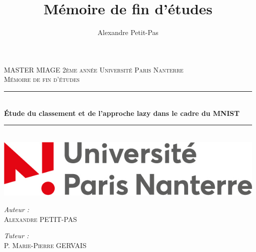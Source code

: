 \documentclass[12pt, twoside, openright]{report}
\author{Alexandre Petit-Pas}
\title{Mémoire de fin d'études}
\begin{document}
%

\setlength{\parindent}{0cm}
\setlength{\parskip}{1ex plus 0.5ex minus 0.2ex}
\newcommand{\hsp}{\hspace{20pt}}
\newcommand{\HRule}{\rule{\linewidth}{0.5mm}}

\begin{titlepage}
  \begin{sffamily}
  \begin{center}

    \textsc{\LARGE MASTER MIAGE 2ème année \linebreak Université Paris Nanterre}\\[2cm]

    \textsc{\Large Mémoire de fin d'études}\\[1.5cm]

    \HRule \\[0.4cm]
    { \huge \bfseries Étude du classement et de l'approche lazy dans le cadre du MNIST \\[0.4cm] }

    \HRule \\[2cm]
    \includegraphics[scale=0.40]{img/logo_nanterre.jpg}
    \hspace{2cm}
    
    \vfill
  \begin{minipage}{0.4\textwidth}
      \begin{flushleft} \large
        \emph{Auteur :}\\ \textsc{Alexandre PETIT-PAS}\\
      \end{flushleft}
    \end{minipage}
    \begin{minipage}{0.4\textwidth}
      \begin{flushright} \large
        \emph{Tuteur :}\\ \textsc{P. Marie-Pierre GERVAIS}\\
      \end{flushright}
    \end{minipage}
    \vfill
  \end{center}
  \end{sffamily}
\end{titlepage}
\end{document}
